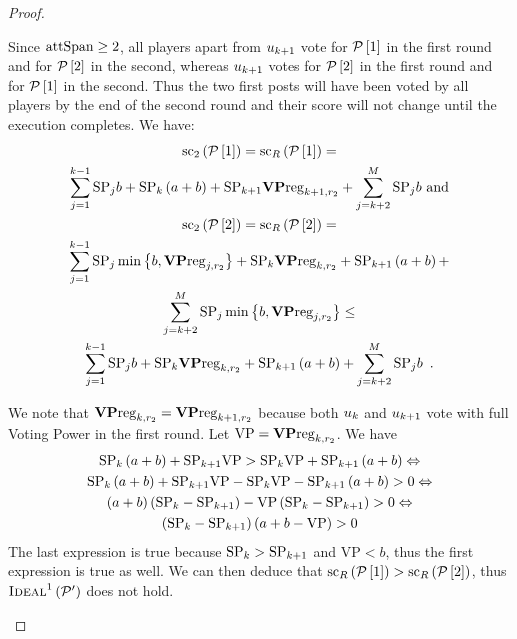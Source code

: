 \begin{proof}
\begin{itemize}
    Since $\mathrm{attSpan} \geq 2$, all players apart from $u_{k + 1}$ vote for
    $\mathcal{P}\left[1\right]$ in the first round and for
    $\mathcal{P}\left[2\right]$ in the second, whereas $u_{k + 1}$ votes for
    $\mathcal{P}\left[2\right]$ in the first round and for
    $\mathcal{P}\left[1\right]$ in the second. Thus the two first posts will have
    been voted by all players by the end of the second round and their score
    will not change until the execution completes. We have:
    \begin{gather*}
      \mathrm{sc}_2\left(\mathcal{P}\left[1\right]\right) =
      \mathrm{sc}_R\left(\mathcal{P}\left[1\right]\right) = \\
      \sum\limits_{j = 1}^{k-1}\mathrm{SP}_j b + \mathrm{SP}_k \left(a + b\right) +
      \mathrm{SP}_{k+1} \mathrm{\textbf{VP}reg}_{k+1,r_2} + \sum\limits_{j = k +
      2}^{M}\mathrm{SP}_j b \text{ and} \\
      \mathrm{sc}_2\left(\mathcal{P}\left[2\right]\right) =
      \mathrm{sc}_R\left(\mathcal{P}\left[2\right]\right) = \\
      \sum\limits_{j = 1}^{k-1}\mathrm{SP}_j \min{\left\{b, \mathrm{\textbf{VP}reg}_{j,
      r_2}\right\}} + \mathrm{SP}_k \mathrm{\textbf{VP}reg}_{k, r_2} + \mathrm{SP}_{k+1} \left(a +
      b\right) + \\
      \sum\limits_{j = k + 2}^{M}\mathrm{SP}_j \min{\left\{b,
      \mathrm{\textbf{VP}reg}_{j, r_2}\right\}} \leq \\
      \sum\limits_{j = 1}^{k-1}\mathrm{SP}_j b + \mathrm{SP}_k \mathrm{\textbf{VP}reg}_{k, r_2} +
      \mathrm{SP}_{k+1} \left(a + b\right) +
      \sum\limits_{j = k + 2}^{M}\mathrm{SP}_j b \enspace.
    \end{gather*}

    We note that $\mathrm{\textbf{VP}reg}_{k, r_2} = \mathrm{\textbf{VP}reg}_{k+1, r_2}$ because
    both $u_k$ and $u_{k+1}$ vote with full Voting Power in the
    first round. Let $\mathrm{VP} = \mathrm{\textbf{VP}reg}_{k, r_2}$. We have
    \begin{gather*}
      \mathrm{SP}_k \left(a + b\right) + \mathrm{SP}_{k+1} \mathrm{VP} > \mathrm{SP}_k
      \mathrm{VP} + \mathrm{SP}_{k+1} \left(a + b\right) \Leftrightarrow \\
      \mathrm{SP}_k \left(a + b\right) + \mathrm{SP}_{k+1} \mathrm{VP} - \mathrm{SP}_k
      \mathrm{VP} - \mathrm{SP}_{k+1} \left(a + b\right) > 0 \Leftrightarrow \\
      \left(a + b\right) \left(\mathrm{SP}_k - \mathrm{SP}_{k+1}\right) - \mathrm{VP}
      \left(\mathrm{SP}_k - \mathrm{SP}_{k+1}\right) > 0 \Leftrightarrow \\
      \left(\mathrm{SP}_k - \mathrm{SP}_{k+1}\right) \left(a + b - \mathrm{VP}\right) > 0
    \end{gather*}
    The last expression is true because $\mathrm{SP}_k > \mathrm{SP}_{k+1}$ and
    $\mathrm{VP} < b$, thus the first expression is true as well. We can then
    deduce that $\mathrm{sc}_R\left(\mathcal{P}\left[1\right]\right) >
    \mathrm{sc}_R\left(\mathcal{P}\left[2\right]\right)$, thus
    $\textsc{Ideal}^1\left(\mathcal{P}'\right)$ does not hold.


\end{itemize}
\end{proof}

